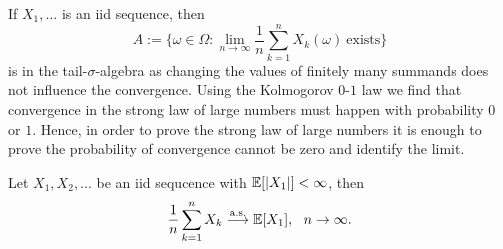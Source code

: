 If $X_1,...$ is an iid sequence, then $$A:=\Big\{\omega\in \Omega:\lim_{n\to\infty} \frac{1}{n}\sum\limits_{k=1}^{n}X_k(\omega) \:\text{exists}\Big\}$$ is in the tail-$\sigma$-algebra as changing the values of finitely many summands does not influence the convergence. Using the Kolmogorov $0$-$1$ law we find that convergence in the strong law of large numbers must happen with probability $0$ or $1$. Hence, in order to prove the strong law of large numbers it is enough to prove the probability of convergence cannot be zero and identify the limit.
\begin{lsuperwichtigersatz}
\begin{theorem}\label{SLLN}
	Let $X_1,X_2,...$ be an iid sequcence with $\mathbb{E}[\lvert X_1 \rvert ]< \infty$, then
	\begin{align*}
		\frac{1}{n}\sum\limits_{k=1}^{n}X_k \overset{\text{a.s.}}{\longrightarrow} \mathbb{E}[X_1], \:\:\: n\to \infty.
	\end{align*}
\end{theorem}
\end{lsuperwichtigersatz}
